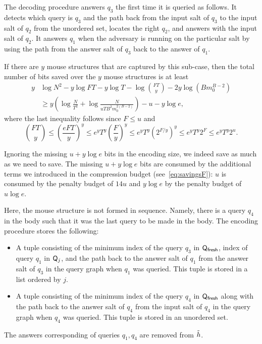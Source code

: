 {The decoding procedure answers $q_3$ the first time it is queried as follows. It detects which query is $q_3$ and the path back from the input salt of $q_3$ to the input salt of $q_2$ from the unordered set, locates the right $q_2$, and answers with the input salt of $q_2$. It answers $q_1$ when the adversary is running on the particular salt by using the path from the answer salt of $q_3$ back to the answer of $q_1$.

If there are $y$ mouse structures that are captured by this sub-case, then the total number of bits saved over the $y$ mouse structures is at least
\begin{align*}
y& \log N^2-y\log FT - y\log T -\log \binom {FT}{y} -2y\log (Bm_0^{B-2}) \\ 
& \ge y\left(\log \frac{N}{T^2} +\log \frac{N}{uTB^2m_0^{2(B-2)}}\right)-u -y \log e ,
\end{align*}
where the last inequality follows since $F\le u$ and $$\binom{FT}{y}\le \left(\frac{eFT}{y}\right)^y\le e^yT^y \left(\frac{F}{y}\right)^y\le e^yT^y (2^{F/y})^y\leq e^yT^y 2^F\leq  e^yT^y 2^u.$$ 

Ignoring the missing $u+y \log e$ bits in the encoding size, we indeed save as much as we need to save. The missing $u+y\log e$ bits are consumed by the additional terms we introduced in the compression budget (see~\eqref{eq:savingsF}): $u$ is consumed by the penalty budget of $14u$ and $y\log e$ by the penalty budget of $u\log e$. 



Here, the mouse structure is not formed in sequence.
Namely, there is a query $q_4$ in the body such that it was the last query to be made in the body. The encoding procedure stores the following:
\begin{itemize}
  \item A tuple consisting of the minimum index of the query $q_3$ in $\mathsf{Q}_\textsf{fresh}$, index of query $q_1$ in $\mathsf{Q}_j$, and the path back to the answer salt of $q_1$ from the answer salt of $q_3$ in the query graph when $q_1$ was queried.  This tuple is stored in a list ordered by $j$.
  \item A tuple consisting of the minimum index of the query $q_4$ in $\mathsf{Q}_\textsf{fresh}$ along with the path back to the answer salt of $q_4$ from the input salt of $q_4$ in the query graph when $q_4$ was queried. This tuple is stored in an unordered set.
\end{itemize}
The answers corresponding of queries $q_1,q_4$ are removed from $\tilde{h}$.

}
